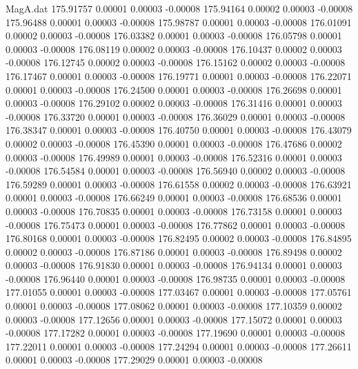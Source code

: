 \begin{filecontents}{MagA.dat}
 175.91757    0.00001    0.00003   -0.00008
 175.94164    0.00002    0.00003   -0.00008
 175.96488    0.00001    0.00003   -0.00008
 175.98787    0.00001    0.00003   -0.00008
 176.01091    0.00002    0.00003   -0.00008
 176.03382    0.00001    0.00003   -0.00008
 176.05798    0.00001    0.00003   -0.00008
 176.08119    0.00002    0.00003   -0.00008
 176.10437    0.00002    0.00003   -0.00008
 176.12745    0.00002    0.00003   -0.00008
 176.15162    0.00002    0.00003   -0.00008
 176.17467    0.00001    0.00003   -0.00008
 176.19771    0.00001    0.00003   -0.00008
 176.22071    0.00001    0.00003   -0.00008
 176.24500    0.00001    0.00003   -0.00008
 176.26698    0.00001    0.00003   -0.00008
 176.29102    0.00002    0.00003   -0.00008
 176.31416    0.00001    0.00003   -0.00008
 176.33720    0.00001    0.00003   -0.00008
 176.36029    0.00001    0.00003   -0.00008
 176.38347    0.00001    0.00003   -0.00008
 176.40750    0.00001    0.00003   -0.00008
 176.43079    0.00002    0.00003   -0.00008
 176.45390    0.00001    0.00003   -0.00008
 176.47686    0.00002    0.00003   -0.00008
 176.49989    0.00001    0.00003   -0.00008
 176.52316    0.00001    0.00003   -0.00008
 176.54584    0.00001    0.00003   -0.00008
 176.56940    0.00002    0.00003   -0.00008
 176.59289    0.00001    0.00003   -0.00008
 176.61558    0.00002    0.00003   -0.00008
 176.63921    0.00001    0.00003   -0.00008
 176.66249    0.00001    0.00003   -0.00008
 176.68536    0.00001    0.00003   -0.00008
 176.70835    0.00001    0.00003   -0.00008
 176.73158    0.00001    0.00003   -0.00008
 176.75473    0.00001    0.00003   -0.00008
 176.77862    0.00001    0.00003   -0.00008
 176.80168    0.00001    0.00003   -0.00008
 176.82495    0.00002    0.00003   -0.00008
 176.84895    0.00002    0.00003   -0.00008
 176.87186    0.00001    0.00003   -0.00008
 176.89498    0.00002    0.00003   -0.00008
 176.91830    0.00001    0.00003   -0.00008
 176.94134    0.00001    0.00003   -0.00008
 176.96440    0.00001    0.00003   -0.00008
 176.98735    0.00001    0.00003   -0.00008
 177.01055    0.00001    0.00003   -0.00008
 177.03467    0.00001    0.00003   -0.00008
 177.05761    0.00001    0.00003   -0.00008
 177.08062    0.00001    0.00003   -0.00008
 177.10359    0.00002    0.00003   -0.00008
 177.12656    0.00001    0.00003   -0.00008
 177.15072    0.00001    0.00003   -0.00008
 177.17282    0.00001    0.00003   -0.00008
 177.19690    0.00001    0.00003   -0.00008
 177.22011    0.00001    0.00003   -0.00008
 177.24294    0.00001    0.00003   -0.00008
 177.26611    0.00001    0.00003   -0.00008
 177.29029    0.00001    0.00003   -0.00008

\end{filecontents}
